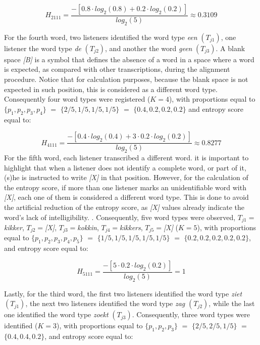 \documentclass[
sn-apacite
]{sn-jnl}
\begin{document}
\[ 
H_{2111} = \frac{ -\left[ 0.8 \cdot log_{2}(0.8) + 0.2 \cdot log_{2}(0.2) \right] }{ log_{2}(5)} \approx 0.3109
\]

{For the fourth word,} two listeners identified the word type \emph{een}
\((T_{j1})\), one listener the word type \emph{de} \((T_{j2})\), and
another the word \emph{geen} \((T_{j3})\). A blank space \emph{{[}B{]}}
is a symbol that defines the absence of a word in a space where a word
is expected, as compared with other transcriptions, during the alignment
procedure. Notice that for calculation purposes, because the blank space
is not expected in such position, this is considered as a different word
type. Consequently four word types were registered (\(K=4\)), with
proportions equal to \(\{ p_{1}, p_{2}, p_{3}, p_{4} \}\) \(=\)
\(\{ 2/5, 1/5, 1/5, 1/5 \}\) \(=\) \(\{ 0.4, 0.2, 0.2, 0.2 \}\) and
entropy score equal to:

\[ 
H_{4111} = \frac{ -\left[ 0.4 \cdot log_{2}(0.4) + 3 \cdot 0.2 \cdot log_{2}(0.2) \right] }{ log_{2}(5)} \approx 0.8277
\] {For the fifth word,} each listener transcribed a different word. it
is important to highlight that when a listener does not identify a
complete word, or part of it, (s)he is instructed to write
\emph{{[}X{]}} in that position. However, for the calculation of the
entropy score, if more than one listener marks an unidentifiable word
with \emph{{[}X{]}}, each one of them is considered a different word
type. This is done to avoid the artificial reduction of the entropy
score, as \emph{{[}X{]}} values already indicate the word's lack of
intelligibility. . Consequently, five word types were observed,
\(T_{j1}=\)\emph{kikker}, \(T_{j2}=\)\emph{{[}X{]}},
\(T_{j3}=\)\emph{kokkin}, \(T_{j4}=\)\emph{kikkers},
\(T_{j5}=\)\emph{{[}X{]}} (\(K=5\)), with proportions equal to
\(\{ p_{1}, p_{2}, p_{3}, p_{4}, p_{5} \}\) \(=\)
\(\{ 1/5, 1/5, 1/5, 1/5, 1/5 \}\) \(=\)
\(\{ 0.2, 0.2, 0.2, 0.2, 0.2 \}\), and entropy score equal to:

\[ 
H_{5111} = \frac{ -\left[ 5 \cdot 0.2 \cdot log_{2}(0.2) \right] }{ log_{2}(5)} = 1
\]

{Lastly, for the third word, the first two listeners identified the word
type \emph{ziet} \((T_{j1})\), the next two listeners identified the
word type \emph{zag} \((T_{j2})\), while the last one identified the
word type \emph{zoekt} \((T_{j3})\). Consequently, three word types were
identified (\(K=3\)), with proportions equal to
\(\{ p_{1}, p_{2}, p_{3} \}\) \(=\) \(\{ 2/5, 2/5, 1/5 \}\) \(=\)
\(\{ 0.4, 0.4, 0.2 \}\), and entropy score equal to:}
\end{document}
